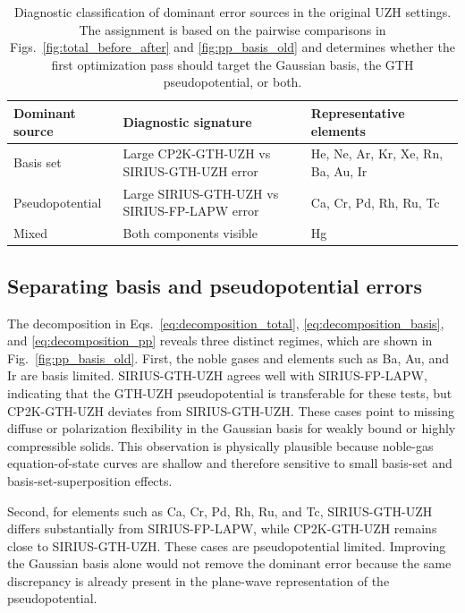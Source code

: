 \documentclass[aps,prb,reprint,amsmath,amssymb,superscriptaddress,longbibliography,floatfix]{revtex4-2}
\begin{document}
\begin{table}
\caption{\label{tab:classification}
Diagnostic classification of dominant error sources in the original UZH settings. The assignment is based on the pairwise comparisons in Figs.~\ref{fig:total_before_after} and \ref{fig:pp_basis_old} and determines whether the first optimization pass should target the Gaussian basis, the GTH pseudopotential, or both.}
\begin{ruledtabular}
\begin{tabular}{lll}
Dominant source & Diagnostic signature & Representative elements \\
\hline
Basis set & Large CP2K-GTH-UZH vs SIRIUS-GTH-UZH error & He, Ne, Ar, Kr, Xe, Rn, Ba, Au, Ir \\
Pseudopotential & Large SIRIUS-GTH-UZH vs SIRIUS-FP-LAPW error & Ca, Cr, Pd, Rh, Ru, Tc \\
Mixed & Both components visible & Hg  \\
\end{tabular}
\end{ruledtabular}
\end{table}

\subsection{Separating basis and pseudopotential errors}

The decomposition in Eqs.~\ref{eq:decomposition_total}, \ref{eq:decomposition_basis}, and \ref{eq:decomposition_pp} reveals three distinct regimes, which are shown in Fig.~\ref{fig:pp_basis_old}. First, the noble gases and elements such as Ba, Au, and Ir are basis limited. SIRIUS-GTH-UZH agrees well with SIRIUS-FP-LAPW, indicating that the GTH-UZH pseudopotential is transferable for these tests, but CP2K-GTH-UZH deviates from SIRIUS-GTH-UZH. These cases point to missing diffuse or polarization flexibility in the Gaussian basis for weakly bound or highly compressible solids. This observation is physically plausible because noble-gas equation-of-state curves are shallow and therefore sensitive to small basis-set and basis-set-superposition effects.

Second, for elements such as Ca, Cr, Pd, Rh, Ru, and Tc, SIRIUS-GTH-UZH differs substantially from SIRIUS-FP-LAPW, while CP2K-GTH-UZH remains close to SIRIUS-GTH-UZH. These cases are pseudopotential limited. Improving the Gaussian basis alone would not remove the dominant error because the same discrepancy is already present in the plane-wave representation of the pseudopotential.
\end{document}
